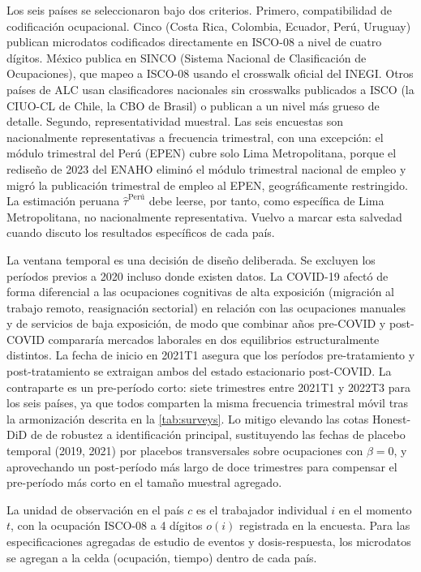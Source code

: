 Los seis países se seleccionaron bajo dos criterios. Primero, compatibilidad de codificación ocupacional. Cinco (Costa Rica, Colombia, Ecuador, Perú, Uruguay) publican microdatos codificados directamente en ISCO-08 a nivel de cuatro dígitos. México publica en SINCO (Sistema Nacional de Clasificación de Ocupaciones), que mapeo a ISCO-08 usando el crosswalk oficial del INEGI. Otros países de ALC usan clasificadores nacionales sin crosswalks publicados a ISCO (la CIUO-CL de Chile, la CBO de Brasil) o publican a un nivel más grueso de detalle. Segundo, representatividad muestral. Las seis encuestas son nacionalmente representativas a frecuencia trimestral, con una excepción: el módulo trimestral del Perú (EPEN) cubre solo Lima Metropolitana, porque el rediseño de 2023 del ENAHO eliminó el módulo trimestral nacional de empleo y migró la publicación trimestral de empleo al EPEN, geográficamente restringido. La estimación peruana $\hat\tau^{\text{Perú}}$ debe leerse, por tanto, como específica de Lima Metropolitana, no nacionalmente representativa. Vuelvo a marcar esta salvedad cuando discuto los resultados específicos de cada país.

La ventana temporal es una decisión de diseño deliberada. Se excluyen los períodos previos a 2020 incluso donde existen datos. La COVID-19 afectó de forma diferencial a las ocupaciones cognitivas de alta exposición (migración al trabajo remoto, reasignación sectorial) en relación con las ocupaciones manuales y de servicios de baja exposición, de modo que combinar años pre-COVID y post-COVID compararía mercados laborales en dos equilibrios estructuralmente distintos. La fecha de inicio en 2021T1 asegura que los períodos pre-tratamiento y post-tratamiento se extraigan ambos del estado estacionario post-COVID. La contraparte es un pre-período corto: siete trimestres entre 2021T1 y 2022T3 para los seis países, ya que todos comparten la misma frecuencia trimestral móvil tras la armonización descrita en la \cref{tab:surveys}. Lo mitigo elevando las cotas Honest-DiD de \citet{RambachanRoth2023_honest} de robustez a identificación principal, sustituyendo las fechas de placebo temporal (2019, 2021) por placebos transversales sobre ocupaciones con $\beta = 0$, y aprovechando un post-período más largo de doce trimestres para compensar el pre-período más corto en el tamaño muestral agregado.

La unidad de observación en el país $c$ es el trabajador individual $i$ en el momento $t$, con la ocupación ISCO-08 a 4 dígitos $o(i)$ registrada en la encuesta. Para las especificaciones agregadas de estudio de eventos y dosis-respuesta, los microdatos se agregan a la celda (ocupación, tiempo) dentro de cada país.

